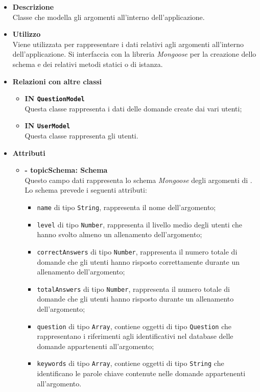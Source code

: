 \begin{itemize}
	\item \textbf{Descrizione} \\
	Classe che modella gli argomenti all'interno dell'applicazione.
	\item \textbf{Utilizzo} \\
	Viene utilizzata per rappresentare i dati relativi agli argomenti all'interno dell'applicazione. Si interfaccia con la libreria \textit{Mongoose} per la creazione dello schema e dei relativi metodi statici o di istanza.
	\item \textbf{Relazioni con altre classi}
		\begin{itemize}
			\item \textbf{IN \texttt{QuestionModel}} \\
			Questa classe rappresenta i dati delle domande create dai vari utenti;
			\item \textbf{IN \texttt{UserModel}} \\
			Questa classe rappresenta gli utenti.
		\end{itemize}
	\item \textbf{Attributi}
		\begin{itemize}
			\item \textbf{- topicSchema: Schema} \\
			Questo campo dati rappresenta lo schema \textit{Mongoose} degli argomenti di \progetto. Lo schema prevede i seguenti attributi:
				\begin{itemize}
					\item \texttt{name} di tipo \texttt{String}, rappresenta il nome dell'argomento;
					\item \texttt{level} di tipo \texttt{Number}, rappresenta il livello medio degli utenti che hanno svolto almeno un allenamento dell'argomento;
					\item \texttt{correctAnswers} di tipo \texttt{Number}, rappresenta il numero totale di domande che gli utenti hanno risposto correttamente durante un allenamento dell'argomento; 
					\item \texttt{totalAnswers} di tipo \texttt{Number}, rappresenta il numero totale di domande che gli utenti hanno risposto durante un allenamento dell'argomento;
					\item \texttt{question} di tipo \texttt{Array}, contiene oggetti di tipo \texttt{Question} che rappresentano i riferimenti agli identificativi nel database delle domande appartenenti all'argomento;
					\item \texttt{keywords} di tipo \texttt{Array}, contiene oggetti di tipo \texttt{String} che identificano le parole chiave contenute nelle domande appartenenti all'argomento.

\end{itemize}
\end{itemize}
\end{itemize}
